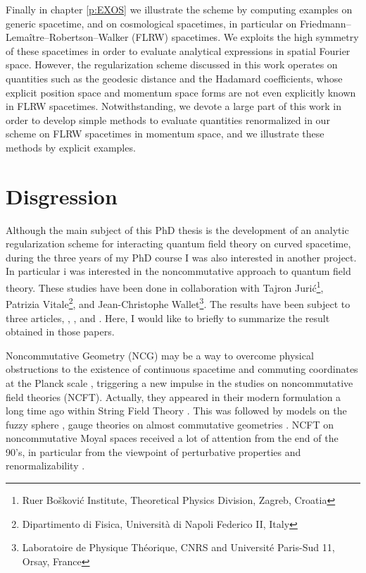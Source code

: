 \documentclass[11pt]{book}
\theoremstyle{break}
\begin{document}
\bigskip


Finally in chapter \ref{p:EXOS} we illustrate the scheme by computing examples on generic spacetime, and on cosmological spacetimes, in particular on Friedmann--Lemaître--Robertson--Walker (FLRW) spacetimes. We exploits the high symmetry of these spacetimes in order to evaluate analytical expressions in spatial Fourier space. However, the regularization scheme discussed in this work operates on quantities such as the geodesic distance and the Hadamard coefficients, whose explicit position space and momentum space forms are not even explicitly known in FLRW spacetimes. Notwithstanding, we devote a large part of this work in order to develop simple methods to evaluate quantities renormalized in our scheme on FLRW spacetimes in momentum space, and we illustrate these methods by explicit examples.


\section*{Disgression}


Although the main subject of this PhD thesis is the development of an analytic regularization scheme for interacting quantum field theory on curved spacetime, during the three years of my PhD course I was also interested in another project. In particular i was interested in the noncommutative approach to quantum field theory. These studies have been done in collaboration with Tajron Juri\'c\footnote{Ru\dj er Bo\v{s}kovi\'c Institute, Theoretical Physics Division, Zagreb, Croatia}, Patrizia Vitale\footnote{Dipartimento di Fisica, Universit\`a di Napoli Federico II, Italy}, and Jean-Christophe Wallet\footnote{Laboratoire de Physique Th\'eorique, CNRS and Universit\'e Paris-Sud 11, Orsay, France}. The results have been subject to three articles, \cite{GW_2015}, \cite{GJW_2015}, and \cite{GVW_2014}. Here, I would like to briefly to summarize the result obtained in those papers.\par%


\bigskip


Noncommutative Geometry (NCG) \cite{CONNES_1994} may be a way to overcome physical obstructions to the existence of continuous spacetime and commuting coordinates at the Planck scale \cite{DFR_1994}, triggering a new impulse in the studies on noncommutative field theories (NCFT). Actually, they appeared in their modern formulation a long time ago within String Field Theory \cite{WITTEN_1986}. This was followed by models on the fuzzy sphere \cite{MADORE_1999}, gauge theories on almost commutative geometries \cite{DV_1999}. NCFT on noncommutative Moyal spaces received a lot of attention from the end of the 90's, in particular from the viewpoint of perturbative properties and renormalizability \cite{MVRS_2000}.\par%
\end{document}
